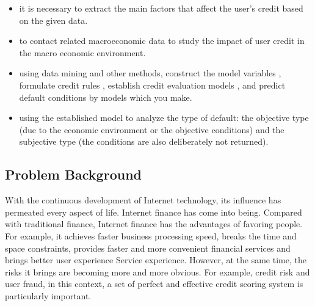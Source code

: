 \documentclass{mcmthesis}
\begin{document}
\begin{itemize}
\item it is necessary to extract the main factors that affect the user's credit based on the given data.
\item to contact related macroeconomic data to study the impact of user credit in the macro economic environment.
\item using data mining and other methods, construct the model variables ,  formulate credit rules , establish credit evaluation models , and predict default conditions by models which you make.
\item using the established model to analyze the type of default: the objective type (due to the economic environment or the objective conditions) and the subjective type (the conditions are also deliberately not returned).
\end{itemize}
\subsection{Problem Background}
With the continuous development of Internet technology, its influence has permeated every aspect of life. Internet finance has come into being. Compared with traditional finance, Internet finance has the advantages of favoring people. For example, it achieves faster business processing speed, breaks the time and space constraints, provides faster and more convenient financial services and brings better user experience Service experience. However, at the same time, the risks it brings are becoming more and more obvious. For example, credit risk and user fraud, in this context, a set of perfect and effective credit scoring system is particularly important.\\
\end{document}
